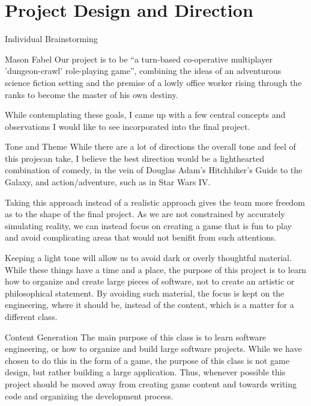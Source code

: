\documentclass[12pt]{report}
\begin{document}
\chapter{Project Design and Direction}

\begin{section}{Individual Brainstorming}

\begin{subsection}{Mason Fabel}
Our project is to be ``a turn-based co-operative multiplayer
'dungeon-crawl' role-playing game'', combining the ideas of an adventurous
science fiction setting and the premise of a lowly office worker rising
through the ranks to become the master of his own destiny.

While contemplating these goals, I came up with a few central concepts and
observations I would like to see incorporated into the final project.

\begin{subsubsection}{Tone and Theme}
While there are a lot of directions the overall tone and feel of this
projecan take, I believe the best direction would be a lighthearted
combination of comedy, in the vein of Douglas Adam's Hitchhiker's Guide to
the Galaxy, and action/adventure, such as in Star Wars IV.

Taking this approach instead of a realistic approach gives the team more
freedom as to the shape of the final project. As we are not constrained by
accurately simulating reality, we can instead focus on creating a game that
is fun to play and avoid complicating areas that would not benifit from
such attentions.

Keeping a light tone will allow us to avoid dark or overly thoughtful
material. While these things have a time and a place, the purpose
of this project is to learn how to organize and create large pieces of
software, not to create an artistic or philosophical statement. By avoiding
such material, the focus is kept on the engineering, where it should be,
instead of the content, which is a matter for a different class.
\end{subsubsection}

\begin{subsubsection}{Content Generation}
The main purpose of this class is to learn software engineering, or how
to organize and build large software projects. While we have chosen to do
this in the form of a game, the purpose of this class is not game design,
but rather building a large application. Thus, whenever possible this
project should be moved away from creating game content and towards writing
code and organizing the development process.


\end{subsubsection}
\end{subsection}
\end{section}
\end{document}
